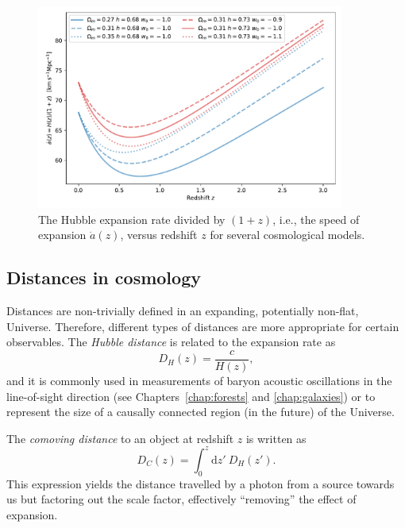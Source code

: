     \begin{figure}[t]
        \centering 
        \includegraphics[width=0.9\textwidth]{fig/intro/hubble.pdf}
        \caption{The Hubble expansion rate divided by $(1+z)$, i.e., the speed of expansion $\dot{a}(z)$, 
        versus redshift $z$ for several cosmological models. }
        \label{fig:hubble_theory}
    \end{figure}

    \subsection{Distances in cosmology}
    \label{intro:model:distances}

    Distances are non-trivially defined in an expanding, potentially non-flat, Universe. 
    Therefore, different types of distances are more appropriate for certain observables.
    The \emph{Hubble distance} is related to the expansion rate as 
    \begin{equation}
        D_H(z) = \frac{c}{H(z)},
        \label{eq:hubble_distance}
    \end{equation}
    and it is commonly used in measurements of baryon acoustic oscillations in the line-of-sight 
    direction (see Chapters~\ref{chap:forests} and \ref{chap:galaxies}) or to represent the
    size of a causally connected region (in the future) of the Universe. 
    
    The \emph{comoving distance} to 
    an object at redshift $z$ is written as
    \begin{equation}
        D_C(z)  = \int_0^z \mathrm{d}z' ~ D_H(z').
        \label{eq:comoving_distance}
    \end{equation} 
    This expression yields the distance travelled by a photon from a source towards us but 
    factoring out the scale factor, effectively ``removing'' the effect of expansion. 
    
